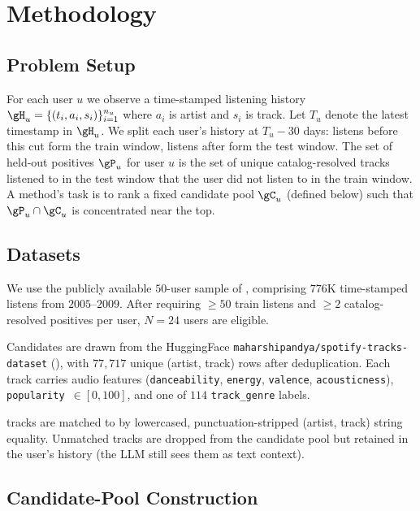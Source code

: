 \section{Methodology}
\label{sec:method}

\subsection{Problem Setup}

For each user $u$ we observe a time-stamped listening history $\gH_u = \{(t_i, a_i, s_i)\}_{i=1}^{n_u}$ where $a_i$ is artist and $s_i$ is track. Let $T_u$ denote the latest timestamp in $\gH_u$. We split each user's history at $T_u - 30$ days: listens before this cut form the train window, listens after form the test window. The set of held-out positives $\gP_u$ for user $u$ is the set of unique catalog-resolved tracks listened to in the test window that the user did not listen to in the train window. A method's task is to rank a fixed candidate pool $\gC_u$ (defined below) such that $\gP_u \cap \gC_u$ is concentrated near the top.

\subsection{Datasets}
\label{sec:datasets}

 We use the publicly available $50$-user sample of \lastfm \citep{schedl2017lfm1b}, comprising $776$K time-stamped listens from $2005$--$2009$. After requiring $\ge 50$ train listens and $\ge 2$ catalog-resolved positives per user, $N{=}24$ users are eligible.

 Candidates are drawn from the HuggingFace \texttt{maharshipandya/spotify-tracks-dataset} (\spotcat), with $77{,}717$ unique (artist, track) rows after deduplication. Each track carries audio features (\texttt{danceability}, \texttt{energy}, \texttt{valence}, \texttt{acousticness}), \texttt{popularity}~$\in [0, 100]$, and one of $114$ \texttt{track\_genre} labels.

 \lastfm tracks are matched to \spotcat by lowercased, punctuation-stripped (artist, track) string equality. Unmatched tracks are dropped from the candidate pool but retained in the user's history (the LLM still sees them as text context).

\subsection{Candidate-Pool Construction}
\label{sec:pool}

